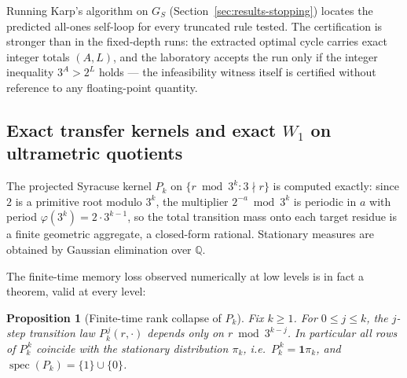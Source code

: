 \documentclass[11pt]{amsart}
\newtheorem{proposition}[theorem]{Proposition}
\theoremstyle{definition}
\theoremstyle{remark}
\newcommand{\dW}{W_1}
\begin{document}
Running Karp's algorithm on $G_S$ (Section~\ref{sec:results-stopping}) locates the predicted all-ones self-loop for every truncated rule tested. The certification is stronger than in the fixed-depth runs: the extracted optimal cycle carries exact integer totals $(A, L)$, and the laboratory accepts the run only if the integer inequality $3^A > 2^L$ holds --- the infeasibility witness itself is certified without reference to any floating-point quantity.

\subsection{Exact transfer kernels and exact $\dW$ on ultrametric quotients}\label{sec:transfer-alg}

The projected Syracuse kernel $P_k$ on $\{r \bmod 3^k : 3 \nmid r\}$ is computed exactly: since $2$ is a primitive root modulo $3^k$, the multiplier $2^{-a} \bmod 3^k$ is periodic in $a$ with period $\varphi(3^k) = 2\cdot 3^{k-1}$, so the total transition mass onto each target residue is a finite geometric aggregate, a closed-form rational. Stationary measures are obtained by Gaussian elimination over $\mathbb{Q}$.

The finite-time memory loss observed numerically at low levels is in fact a theorem, valid at every level:

\begin{proposition}[Finite-time rank collapse of $P_k$]\label{prop:rankcollapse}
Fix $k \ge 1$. For $0 \le j \le k$, the $j$-step transition law $P_k^{\,j}(r,\cdot)$ depends only on $r \bmod 3^{k-j}$. In particular all rows of $P_k^{\,k}$ coincide with the stationary distribution $\pi_k$, i.e.\ $P_k^{\,k} = \mathbf{1}\pi_k$, and $\operatorname{spec}(P_k) = \{1\} \cup \{0\}$.
\end{proposition}
\end{document}
